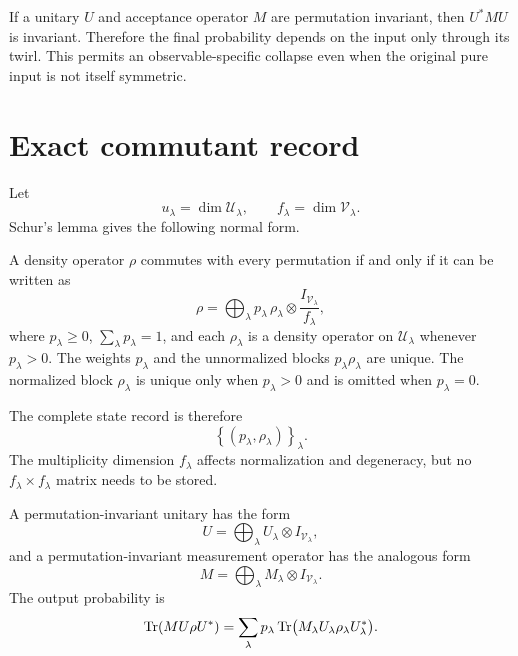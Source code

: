 If a unitary $U$ and acceptance operator $M$ are permutation invariant, then $U^*MU$ is invariant. Therefore the final probability depends on the input only through its twirl. This permits an observable-specific collapse even when the original pure input is not itself symmetric.

\section{Exact commutant record}
Let
\[
u_\lambda=\dim\mathcal U_\lambda,
\qquad
f_\lambda=\dim\mathcal V_\lambda.
\]
Schur's lemma gives the following normal form.

\begin{lemma}
\label{lem:invariant-state-normal-form}
A density operator $\rho$ commutes with every permutation if and only if it can be written as
\begin{equation}
\rho
=
\bigoplus_\lambda
p_\lambda\,\rho_\lambda\otimes
\frac{I_{\mathcal V_\lambda}}{f_\lambda},
\label{eq:commutant-state-record}
\end{equation}
where $p_\lambda\ge0$, $\sum_\lambda p_\lambda=1$, and each $\rho_\lambda$ is a density operator on $\mathcal U_\lambda$ whenever $p_\lambda>0$. The weights $p_\lambda$ and the unnormalized blocks $p_\lambda\rho_\lambda$ are unique. The normalized block $\rho_\lambda$ is unique only when $p_\lambda>0$ and is omitted when $p_\lambda=0$.
\end{lemma}

The complete state record is therefore
\[
\left\{
(p_\lambda,\rho_\lambda)
\right\}_\lambda.
\]
The multiplicity dimension $f_\lambda$ affects normalization and degeneracy, but no $f_\lambda\times f_\lambda$ matrix needs to be stored.

A permutation-invariant unitary has the form
\begin{equation}
U
=
\bigoplus_\lambda
U_\lambda\otimes I_{\mathcal V_\lambda},
\label{eq:commutant-unitary-form}
\end{equation}
and a permutation-invariant measurement operator has the analogous form
\[
M
=
\bigoplus_\lambda
M_\lambda\otimes I_{\mathcal V_\lambda}.
\]
The output probability is
\begin{equation}
\operatorname{Tr}(MU\rho U^*)
=
\sum_\lambda
p_\lambda
\operatorname{Tr}\bigl(M_\lambda U_\lambda\rho_\lambda U_\lambda^*\bigr).
\label{eq:commutant-output}
\end{equation}

